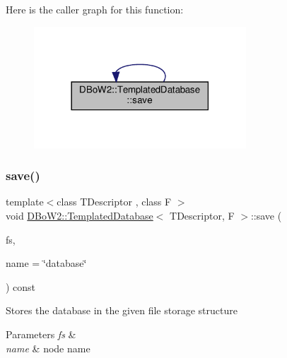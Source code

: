 Here is the caller graph for this function\+:\nopagebreak
\begin{figure}[H]
\begin{center}
\leavevmode
\includegraphics[width=225pt]{classDBoW2_1_1TemplatedDatabase_a7162dee10a5602c309729900bff52ead_icgraph}
\end{center}
\end{figure}
\mbox{\label{classDBoW2_1_1TemplatedDatabase_a69b77a060880f10e11d86d1f665cfd24}} 
\subsubsection{\texorpdfstring{save()}{save()}\hspace{0.1cm}{\footnotesize\ttfamily [2/2]}}
{\footnotesize\ttfamily template$<$class T\+Descriptor , class F $>$ \\
void \hyperlink{classDBoW2_1_1TemplatedDatabase}{D\+Bo\+W2\+::\+Templated\+Database}$<$ T\+Descriptor, F $>$\+::save (\begin{DoxyParamCaption}\item[{cv\+::\+File\+Storage \&}]{fs,  }\item[{const std\+::string \&}]{name = {\ttfamily \char`\"{}database\char`\"{}} }\end{DoxyParamCaption}) const\hspace{0.3cm}{\ttfamily [virtual]}}

Stores the database in the given file storage structure 
\begin{DoxyParams}{Parameters}
{\em fs} & \\
\hline
{\em name} & node name \\
\hline
\end{DoxyParams}
\mbox{\label{classDBoW2_1_1TemplatedDatabase_a7d282bfdd4a6883b282fc71d0fd5dcb4}} 
